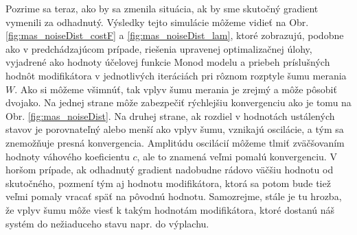 Pozrime sa teraz, ako by sa zmenila situácia, ak by sme skutočný gradient vymenili za odhadnutý. Výsledky tejto simulácie môžeme vidieť na Obr. \ref{fig:mas_noiseDist_costF} a \ref{fig:mas_noiseDist_lam}, ktoré zobrazujú, podobne ako v predchádzajúcom prípade, riešenia upravenej optimalizačnej úlohy, vyjadrené ako hodnoty účelovej funkcie Monod modelu a priebeh príslušných hodnôt modifikátora v jednotlivých iteráciách pri rôznom rozptyle šumu merania $ W $. Ako si môžeme všimnúť, tak vplyv šumu merania je zrejmý a môže pôsobiť dvojako. Na jednej strane môže zabezpečiť rýchlejšiu konvergenciu ako je tomu na Obr.  \ref{fig:mas_noiseDist}. Na druhej strane, ak rozdiel v hodnotách ustálených stavov je porovnateľný alebo menší ako vplyv šumu, vznikajú oscilácie, a tým sa znemožňuje presná konvergencia. Amplitúdu oscilácií môžeme tlmiť zväčšovaním hodnoty váhového koeficientu $ c $, ale to znamená veľmi pomalú konvergenciu. V horšom prípade, ak odhadnutý gradient nadobudne rádovo väčšiu hodnotu od skutočného, pozmení tým aj hodnotu modifikátora, ktorá sa potom bude tiež veľmi pomaly vracať späť na pôvodnú hodnotu. Samozrejme, stále je tu hrozba, že vplyv šumu môže viesť k takým hodnotám modifikátora, ktoré dostanú náš systém do nežiaduceho stavu napr. do výplachu. 
